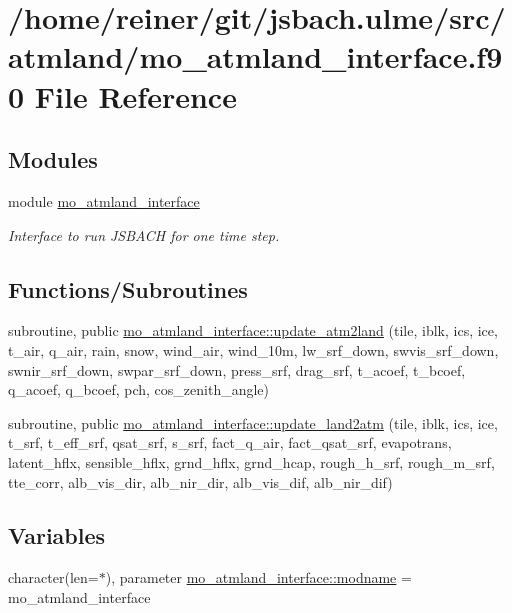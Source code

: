 \hypertarget{mo__atmland__interface_8f90}{}\section{/home/reiner/git/jsbach.ulme/src/atmland/mo\+\_\+atmland\+\_\+interface.f90 File Reference}
\label{mo__atmland__interface_8f90}
\subsection*{Modules}
\begin{DoxyCompactItemize}
\item 
module \hyperlink{namespacemo__atmland__interface}{mo\+\_\+atmland\+\_\+interface}
\begin{DoxyCompactList}\small\item\em Interface to run J\+S\+B\+A\+C\+H for one time step. \end{DoxyCompactList}\end{DoxyCompactItemize}
\subsection*{Functions/\+Subroutines}
\begin{DoxyCompactItemize}
\item 
subroutine, public \hyperlink{namespacemo__atmland__interface_a7bffd74cd79c834a484b49e338156eb0}{mo\+\_\+atmland\+\_\+interface\+::update\+\_\+atm2land} (tile, iblk, ics, ice, t\+\_\+air, q\+\_\+air, rain, snow, wind\+\_\+air, wind\+\_\+10m, lw\+\_\+srf\+\_\+down, swvis\+\_\+srf\+\_\+down, swnir\+\_\+srf\+\_\+down, swpar\+\_\+srf\+\_\+down, press\+\_\+srf, drag\+\_\+srf, t\+\_\+acoef, t\+\_\+bcoef, q\+\_\+acoef, q\+\_\+bcoef, pch, cos\+\_\+zenith\+\_\+angle)
\item 
subroutine, public \hyperlink{namespacemo__atmland__interface_a7fe902b72cc2b66e523616662e7798d6}{mo\+\_\+atmland\+\_\+interface\+::update\+\_\+land2atm} (tile, iblk, ics, ice, t\+\_\+srf, t\+\_\+eff\+\_\+srf, qsat\+\_\+srf, s\+\_\+srf, fact\+\_\+q\+\_\+air, fact\+\_\+qsat\+\_\+srf, evapotrans, latent\+\_\+hflx, sensible\+\_\+hflx, grnd\+\_\+hflx, grnd\+\_\+hcap, rough\+\_\+h\+\_\+srf, rough\+\_\+m\+\_\+srf, tte\+\_\+corr, alb\+\_\+vis\+\_\+dir, alb\+\_\+nir\+\_\+dir, alb\+\_\+vis\+\_\+dif, alb\+\_\+nir\+\_\+dif)
\end{DoxyCompactItemize}
\subsection*{Variables}
\begin{DoxyCompactItemize}
\item 
character(len=$\ast$), parameter \hyperlink{namespacemo__atmland__interface_ab0a7407e48789dbb1c7fef4404d595f4}{mo\+\_\+atmland\+\_\+interface\+::modname} = \textquotesingle{}mo\+\_\+atmland\+\_\+interface\textquotesingle{}
\end{DoxyCompactItemize}
